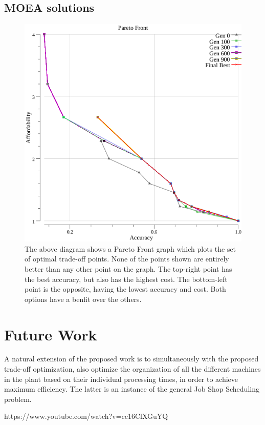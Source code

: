 \documentclass{IEEEtran}
\begin{document}
\subsection{MOEA solutions}
\begin{figure}[!t]
\centerline{\includegraphics[width=\columnwidth]{points.png}}
\caption{The above diagram shows a Pareto Front graph which plots the set of optimal trade-off points. None of the points shown are entirely better than any other point on the graph. The top-right point has the best accuracy, but also has the highest cost. The bottom-left point is the opposite, having the lowest accuracy and cost. Both options have a benfit over the others.}
\end{figure}

\section{Future Work}
A natural extension of the proposed work is to simultaneously with the proposed trade-off optimization, also optimize the organization of all the different machines in the plant based on their individual processing times, in order to achieve maximum efficiency. The latter is an instance of the general Job Shop Scheduling problem.

\begin{thebibliography}{00}
 https://www.youtube.com/watch?v=cc16ClXGuYQ
\end{thebibliography}
\end{document}
